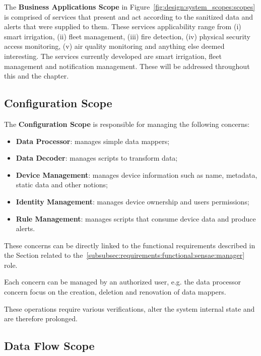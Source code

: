 The \textbf{Business Applications Scope} in Figure~\ref{fig:design:system_scopes:scopes} is comprised of services that present and act according to the sanitized data and alerts that were supplied to them. These services applicability range from (i) smart irrigation, (ii) fleet management, (iii) fire detection, (iv) physical security access monitoring, (v) air quality monitoring and anything else deemed interesting. The services currently developed are smart irrigation, fleet management and notification management. These will be addressed throughout this and the  chapter.

\subsection{Configuration Scope}
\label{subsec:design:system_scopes:configuration_scope}

The \textbf{Configuration Scope} is responsible for managing the following concerns:

\begin{itemize}
   \item \textbf{Data Processor}: manages simple data mappers;
   \item \textbf{Data Decoder}: manages scripts to transform data;
   \item \textbf{Device Management}: manages device information such as name, metadata, static data and other notions;
   \item \textbf{Identity Management}: manages device ownership and users permissions;
   \item \textbf{Rule Management}: manages scripts that consume device data and produce alerts.
\end{itemize}

These concerns can be directly linked to the functional requirements described in the Section related to the~\ref{subsubsec:requirements:functional:sensae:manager} role.

Each concern can be managed by an authorized user, e.g. the data processor concern focus on the creation, deletion and renovation of data mappers.

These operations require various verifications, alter the system internal state and are therefore prolonged.

\subsection{Data Flow Scope}
\label{subsec:design:system_scopes:data_flow_scope}


